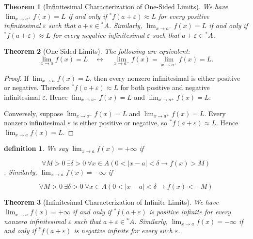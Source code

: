 \documentclass[10pt,a4paper]{book}
\newtheorem{definition}{definition}[section]
\newtheorem{theorem}{Theorem}[section]
\begin{document}
\begin{theorem}[Infinitesimal Characterization of One-Sided Limits]

    We have $\lim_{x\to a^+}f(x)=L$ if and only if ${}^*f(a+\varepsilon)\approx L$
    for every positive infinitesimal $\varepsilon$ such that
    $a+\varepsilon\in{}^*A$. Similarly, $\lim_{x\to a^-}f(x)=L$ if and only if
    ${}^*f(a+\varepsilon)\approx L$ for every negative infinitesimal $\varepsilon$
    such that $a+\varepsilon\in{}^*A$.

\end{theorem}

\begin{theorem}[One-Sided Limits]

    The following are equivalent: $$ \lim_{x\to a}f(x)=L \quad \leftrightarrow
        \quad \lim_{x\to a^-}f(x)=\lim_{x\to a^+}f(x)=L. $$

\end{theorem}

\begin{proof}

    If $\lim_{x\to a}f(x)=L$, then every nonzero infinitesimal is either positive
    or negative. Therefore ${}^*f(a+\varepsilon)\approx L$ for both positive and
    negative infinitesimal $\varepsilon$. Hence $\lim_{x\to a^-}f(x)=L$ and
    $\lim_{x\to a^+}f(x)=L$.

    Conversely, suppose $\lim_{x\to a^-}f(x)=L$ and $\lim_{x\to a^+}f(x)=L$. Every
    nonzero infinitesimal $\varepsilon$ is either positive or negative, so
    ${}^*f(a+\varepsilon)\approx L$. Hence $\lim_{x\to a}f(x)=L$.

\end{proof}
\begin{definition}

    We say $\lim_{x\to a}f(x)=+\infty$ if

    $$ \forall
        M>0\ \exists\delta>0\ \forall x\in A\left(0<|x-a|<\delta \to f(x)>M\right)
    $$
    . Similarly, $\lim_{x\to a}f(x)=-\infty$ if

    $$ \forall M>0\ \exists\delta>0\ \forall x\in A\left(0<|x-a|<\delta \to
        f(x)<-M\right)
    $$

\end{definition}

\begin{theorem}[Infinitesimal Characterization of Infinite Limits]

    We have $\lim_{x\to a}f(x)=+\infty$ if and only if ${}^*f(a+\varepsilon)$ is
    positive infinite for every nonzero infinitesimal $\varepsilon$ such that
    $a+\varepsilon\in{}^*A$. Similarly, $\lim_{x\to a}f(x)=-\infty$ if and only if
    ${}^*f(a+\varepsilon)$ is negative infinite for every such $\varepsilon$.

\end{theorem}
\end{document}
